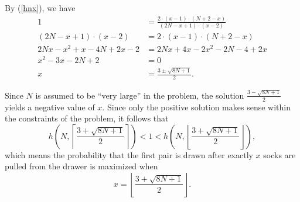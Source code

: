 \documentclass{article}
\begin{document}
By (\ref{hnx}), we have
\begin{align}
1 &= \frac{2 \cdot (x-1) \cdot (N + 2 - x)}{(2N - x + 1) \cdot (x - 2)} \\
(2N - x + 1) \cdot (x - 2) &= 2 \cdot (x-1) \cdot (N + 2 - x) \\
2Nx - x^2 + x - 4N + 2x - 2 &= 2Nx + 4x - 2x^2 - 2N - 4 + 2x \\
x^2 - 3x - 2N + 2 &= 0 \\
x &= \frac{3 \pm \sqrt{8N + 1}}{2}. \label{quadsol}
\end{align}

Since $N$ is assumed to be ``very large'' in the problem, the solution $\frac{3 - \sqrt{8N + 1}}{2}$ yields a negative value of $x.$ Since only the positive solution makes sense within the constraints of the problem,  it follows that
\begin{equation}
h\left(N, \left\lceil \frac{3 + \sqrt{8N + 1}}{2} \right\rceil \right) < 1 < h\left(N, \left\lfloor \frac{3 + \sqrt{8N + 1}}{2} \right\rfloor \right),
\end{equation}
which means the probability that the first pair is drawn after exactly $x$ socks are pulled from the drawer is maximized when
\begin{equation}
x = \left\lfloor \frac{3 + \sqrt{8N + 1}}{2} \right\rfloor.
\end{equation}
\end{document}
